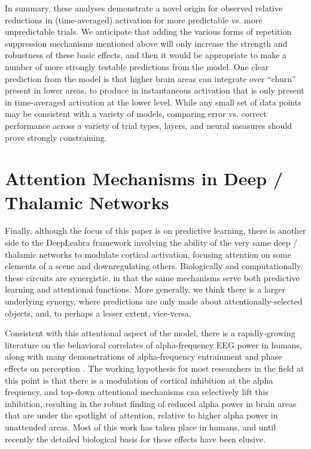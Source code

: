 \documentclass[11pt,twoside]{article}
\newif\myifpdf
\begin{document}
In summary, these analyses demonstrate a novel origin for observed relative reductions in (time-averaged) activation for more predictable vs. more unpredictable trials.  We anticipate that adding the various forms of repetition suppression mechanisms mentioned above will only increase the strength and robustness of these basic effects, and then it would be appropriate to make a number of more strongly testable predictions from the model.  One clear prediction from the model is that higher brain areas can integrate over ``churn'' present in lower areas, to produce in instantaneous activation that is only present in time-averaged activation at the lower level.  While any small set of data points may be consistent with a variety of models, comparing error vs. correct performance across a variety of trial types, layers, and neural measures should prove strongly constraining.

\section{Attention Mechanisms in Deep / Thalamic Networks}

Finally, although the focus of this paper is on predictive learning, there is another side to the DeepLeabra framework involving the ability of the very same deep / thalamic networks to modulate cortical activation, focusing attention on some elements of a scene and downregulating others.  Biologically and computationally these circuits are synergistic, in that the same mechanisms serve both predictive learning and attentional functions.  More generally, we think there is a larger underlying synergy, where predictions are only made about attentionally-selected objects, and, to perhaps a lesser extent, vice-versa. 

Consistent with this attentional aspect of the model, there is a rapidly-growing literature on the behavioral correlates of alpha-frequency EEG power in humans, along with many demonstrations of alpha-frequency entrainment and phase effects on perception \cite{NunnOsselton74,VarelaToroJohnEtAl81,VanRullenKoch03,KlimeschSausengHanslmayr07,BuschDuboisVanRullen09,MathewsonFabianiGrattonEtAl10,JensenMazaheri10,VanrullenDubois11,PalvaPalva11,RohenkohlNobre11,JensenBonnefondVanRullen12,JensenGipsBergmannEtAl14}.  The working hypothesis for most researchers in the field at this point is that there is a modulation of cortical inhibition at the alpha frequency, and top-down attentional mechanisms can selectively lift this inhibition, resulting in the robust finding of reduced alpha power in brain areas that are under the spotlight of attention, relative to higher alpha power in unattended areas.  Most of this work has taken place in humans, and until recently the detailed biological basis for these effects have been elusive.
\end{document}
